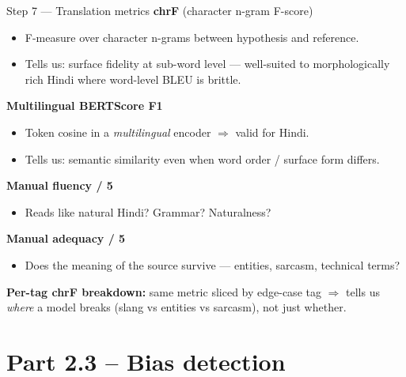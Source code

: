 \documentclass[10pt,aspectratio=169]{beamer}
\begin{document}
\begin{frame}{Step 7 — Translation metrics}
\textbf{chrF} (character n-gram F-score)
\begin{itemize}
  \item F-measure over character n-grams between hypothesis and reference.
  \item Tells us: surface fidelity at sub-word level — well-suited to morphologically rich Hindi where word-level BLEU is brittle.
\end{itemize}

\textbf{Multilingual BERTScore F1}
\begin{itemize}
  \item Token cosine in a \emph{multilingual} encoder $\Rightarrow$ valid for Hindi.
  \item Tells us: semantic similarity even when word order / surface form differs.
\end{itemize}

\textbf{Manual fluency / 5}
\begin{itemize}
  \item Reads like natural Hindi? Grammar? Naturalness?
\end{itemize}

\textbf{Manual adequacy / 5}
\begin{itemize}
  \item Does the meaning of the source survive — entities, sarcasm, technical terms?
\end{itemize}

\medskip
\textbf{Per-tag chrF breakdown:} same metric sliced by edge-case tag $\Rightarrow$ tells us \emph{where} a model breaks (slang vs entities vs sarcasm), not just whether.
\end{frame}

\section{Part 2.3 -- Bias detection}
\end{document}
